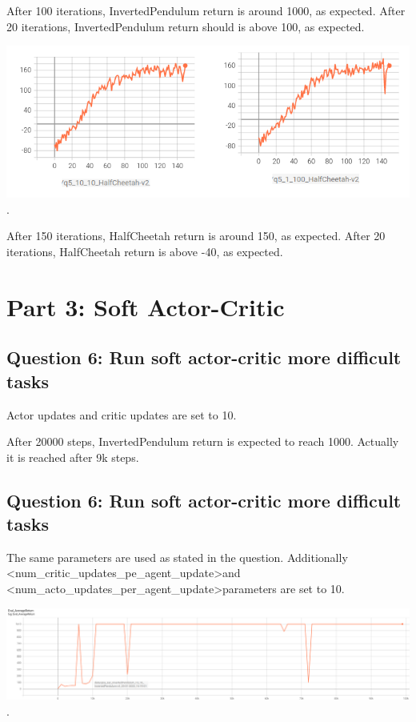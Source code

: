 \documentclass[11pt]{article}
\begin{document}
    After 100 iterations, InvertedPendulum return is around 1000, as expected.
    After 20 iterations, InvertedPendulum return should is above 100, as expected.

    \includegraphics[scale=2]{q5/q5_half_cheetah}.

    After 150 iterations, HalfCheetah return is around 150, as expected.
    After 20 iterations, HalfCheetah return is above -40, as expected.

    \section{Part 3: Soft Actor-Critic}



    \subsection*{Question 6: Run soft actor-critic more difficult tasks}

    Actor updates and critic updates are set to 10.

    After 20000 steps, InvertedPendulum return is expected to reach 1000.
    Actually it is reached after 9k steps.

    \subsection*{Question 6: Run soft actor-critic more difficult tasks}

    The same parameters are used as stated in the question.
    Additionally \textless num\_critic\_updates\_pe\_agent\_update\textgreater and \textless num\_acto\_updates\_per\_agent\_update\textgreater parameters are set to 10.

    \includegraphics[scale=0.66]{q6/inverted_pendulum}.
\end{document}

